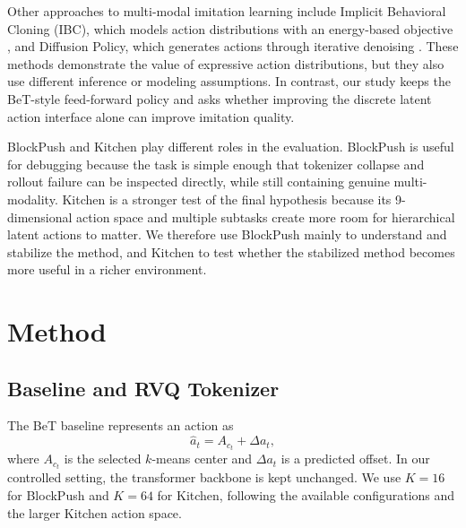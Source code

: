 \documentclass[conference]{IEEEtran}
\begin{document}
Other approaches to multi-modal imitation learning include Implicit Behavioral Cloning (IBC), which models action distributions with an energy-based objective \cite{florence2022implicit}, and Diffusion Policy, which generates actions through iterative denoising \cite{chi2023diffusion}. These methods demonstrate the value of expressive action distributions, but they also use different inference or modeling assumptions. In contrast, our study keeps the BeT-style feed-forward policy and asks whether improving the discrete latent action interface alone can improve imitation quality.

BlockPush and Kitchen play different roles in the evaluation. BlockPush is useful for debugging because the task is simple enough that tokenizer collapse and rollout failure can be inspected directly, while still containing genuine multi-modality. Kitchen is a stronger test of the final hypothesis because its 9-dimensional action space and multiple subtasks create more room for hierarchical latent actions to matter. We therefore use BlockPush mainly to understand and stabilize the method, and Kitchen to test whether the stabilized method becomes more useful in a richer environment.

\section{Method}

\subsection{Baseline and RVQ Tokenizer}

The BeT baseline represents an action as
\begin{equation}
\hat{a}_t = A_{c_t} + \Delta a_t,
\end{equation}
where $A_{c_t}$ is the selected $k$-means center and $\Delta a_t$ is a predicted offset. In our controlled setting, the transformer backbone is kept unchanged. We use $K{=}16$ for BlockPush and $K{=}64$ for Kitchen, following the available configurations and the larger Kitchen action space.
\end{document}
